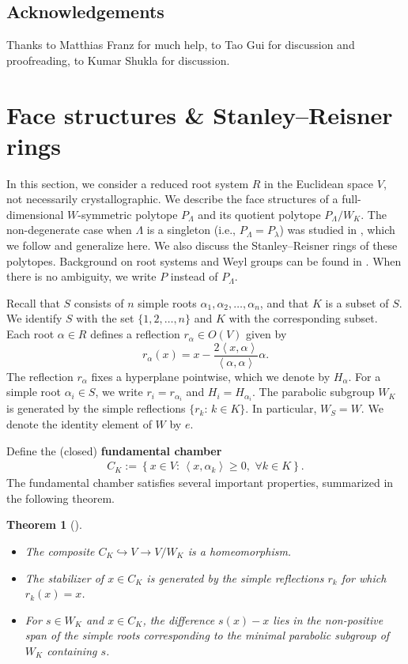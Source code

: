 \documentclass{amsart}
\theoremstyle{plain} \numberwithin{equation}{section}
\newtheorem{theorem}{Theorem}[section]
\theoremstyle{definition}
\newcommand{\ip}[1]{\left\langle #1 \right\rangle}
\begin{document}
{\subsection*{Acknowledgements} Thanks to Matthias Franz for much help, to Tao Gui for discussion and proofreading, to Kumar Shukla for discussion.}


\section{Face structures \& Stanley--Reisner rings}\label{section:faces}

In this section, we consider a reduced root system $R$ in the Euclidean space $V$, not necessarily crystallographic.
We describe the face structures of a full-dimensional $W$-symmetric polytope $P_{\Lambda}$ and its quotient polytope $P_{\Lambda}/W_K$.
The non-degenerate case when $\Lambda$ is a singleton (i.e., $P_{\Lambda}=P_{\lambda}$) was studied in \cite[\S\S 3,5]{gongHomotopyTypesToric2024}, which we follow and generalize here.
We also discuss the Stanley--Reisner rings of these polytopes.
Background on root systems and Weyl groups can be found in \cite[Part I]{humphreysReflectionGroupsCoxeter1992}.
When there is no ambiguity, we write $P$ instead of $P_{\Lambda}$.

Recall that $S$ consists of $n$ simple roots $\alpha_1,\alpha_2,\dots,\alpha_n$, and that $K$ is a subset of $S$.
We identify $S$ with the set $\{1,2,\dots,n\}$ and $K$ with the corresponding subset.
Each root $\alpha\in R$ defines a reflection $r_{\alpha}\in O(V)$ given by 
$$r_{\alpha}(x)=x-\frac{2\ip{x,\alpha}}{\ip{\alpha,\alpha}}\alpha.$$ 
The reflection $r_{\alpha}$ fixes a hyperplane pointwise, which we denote by $H_{\alpha}$.
For a simple root $\alpha_i \in S$, we write $r_i = r_{\alpha_i}$ and $H_i = H_{\alpha_i}$.
The parabolic subgroup $W_K$ is generated by the simple reflections $\{r_k:\, k \in K\}$.
In particular, $W_S = W$. We denote the identity element of $W$ by $e$.

Define the (closed) \textbf{fundamental chamber}
\begin{align*}
  C_K:=\left\{x\in V:\,\ip{x,\alpha_k}\ge 0,\,\, \forall k\in K\right\}.
\end{align*}
The fundamental chamber satisfies several important properties, summarized in the following theorem.
\begin{theorem}[{\cite[\S 1.12]{humphreysReflectionGroupsCoxeter1992}}]\label{thm:fundamental chamber}\phantom{}
  \begin{itemize}
    \item[$(1)$] The composite $C_K\hookrightarrow V\to V/W_K$ is a homeomorphism.
    \item[$(2)$] The stabilizer of $x \in C_K$ is generated by the simple reflections $r_k$ for which $r_k(x) = x$.
    \item[$(3)$] For $s \in W_K$ and $x \in C_K$, the difference $s(x) - x$ lies in the non-positive span of the simple roots corresponding to the minimal parabolic subgroup of $W_K$ containing $s$.
  \end{itemize}
\end{theorem}
\end{document}
